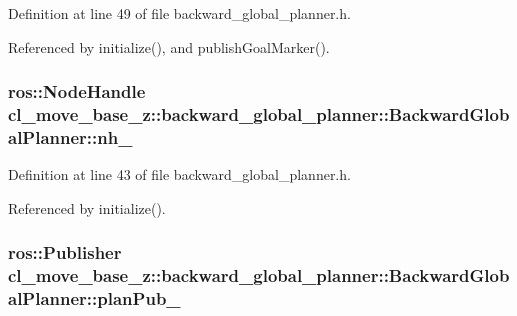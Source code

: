 Definition at line 49 of file backward\+\_\+global\+\_\+planner.\+h.



Referenced by initialize(), and publish\+Goal\+Marker().

\subsubsection[{\texorpdfstring{nh\+\_\+}{nh_}}]{\setlength{\rightskip}{0pt plus 5cm}ros\+::\+Node\+Handle cl\+\_\+move\+\_\+base\+\_\+z\+::backward\+\_\+global\+\_\+planner\+::\+Backward\+Global\+Planner\+::nh\+\_\+\hspace{0.3cm}{\ttfamily [private]}}\hypertarget{classcl__move__base__z_1_1backward__global__planner_1_1BackwardGlobalPlanner_adeb0df38d8dcde919b732724420a401f}{}\label{classcl__move__base__z_1_1backward__global__planner_1_1BackwardGlobalPlanner_adeb0df38d8dcde919b732724420a401f}


Definition at line 43 of file backward\+\_\+global\+\_\+planner.\+h.



Referenced by initialize().

\subsubsection[{\texorpdfstring{plan\+Pub\+\_\+}{planPub_}}]{\setlength{\rightskip}{0pt plus 5cm}ros\+::\+Publisher cl\+\_\+move\+\_\+base\+\_\+z\+::backward\+\_\+global\+\_\+planner\+::\+Backward\+Global\+Planner\+::plan\+Pub\+\_\+\hspace{0.3cm}{\ttfamily [private]}}\hypertarget{classcl__move__base__z_1_1backward__global__planner_1_1BackwardGlobalPlanner_a561eab039140948c52ec928c191f3f43}{}\label{classcl__move__base__z_1_1backward__global__planner_1_1BackwardGlobalPlanner_a561eab039140948c52ec928c191f3f43}


